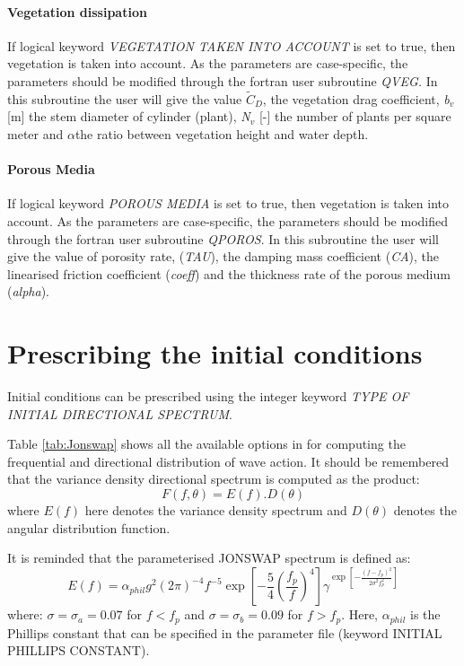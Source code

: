 \paragraph{ Vegetation dissipation}

If logical keyword \textit{VEGETATION TAKEN INTO ACCOUNT} is set to true, then vegetation is taken into account. As the parameters
are case-specific, the parameters should be modified through the fortran user subroutine \textit{QVEG. }In this subroutine the user
will give the value $\tilde{C}_{D} $, the vegetation drag coefficient, \textit{b${}_{v}$} [m] the stem diameter of cylinder (plant),
\textit{N${}_{v}$} [-] the number of plants per square meter and $\alpha $the ratio between vegetation height and water depth.

\paragraph{Porous Media}

If logical keyword \textit{POROUS MEDIA} is set to true, then vegetation is taken into account. As the parameters are case-specific,
the parameters should be modified through the fortran user subroutine \textit{QPOROS}. In this subroutine the user will give the
value of porosity rate, (\textit{TAU}), the damping mass coefficient (\textit{CA}),  the linearised friction coefficient
(\textit{coeff}) and the thickness rate of the porous medium (\textit{alpha}).

 \section{ Prescribing the initial conditions}
\label{se:initcond}
 Initial conditions can be prescribed using the integer keyword \textit{TYPE OF INITIAL DIRECTIONAL SPECTRUM}.

 Table \ref{tab:Jonswap} shows all the available options in \tomawac for computing the frequential and directional distribution of
 wave action. It should be remembered that the variance density directional spectrum is computed as the product:
\[F(f,\theta )=E(f).D(\theta )\]
where $E(f)$ here denotes the variance density spectrum and $D\left(\theta \right)$ denotes the angular distribution function.

 It is reminded that the parameterised JONSWAP spectrum is defined as:
 \[E(f)=\alpha _{phil} g^{2} (2\pi )^{-4} f^{-5} \exp \left[-\frac{5}{4} \left(\frac{f_{p}^{} }{f^{} } \right)^{4} \right]
 \gamma ^{\exp \left[-\frac{\left(f-f_{p} \right)^{2} }{2\sigma ^{2} f_{p}^{2} } \right]} \]
 where:  $\sigma =\sigma_{a} =0.07$ for  $f< f_{p}$  and  $\sigma =\sigma_{b} =0.09$ for  $f> f_{p}$. Here, $\alpha_{phil}$  is
 the Phillips constant that can be specified in the parameter file (keyword INITIAL PHILLIPS CONSTANT).


